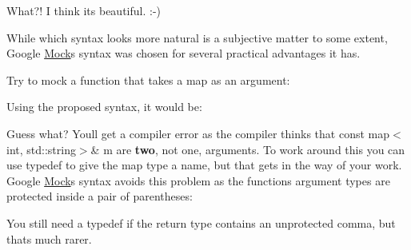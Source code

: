What?! I think it\textquotesingle{}s beautiful. \+:-\/)

While which syntax looks more natural is a subjective matter to some extent, Google \mbox{\hyperlink{class_mock}{Mock}}\textquotesingle{}s syntax was chosen for several practical advantages it has.

Try to mock a function that takes a map as an argument\+: 
\begin{DoxyCode}{0}
\end{DoxyCode}


Using the proposed syntax, it would be\+: 
\begin{DoxyCode}{0}
\end{DoxyCode}


Guess what? You\textquotesingle{}ll get a compiler error as the compiler thinks that {\ttfamily const map$<$int, std\+::string$>$\& m} are {\bfseries{two}}, not one, arguments. To work around this you can use {\ttfamily typedef} to give the map type a name, but that gets in the way of your work. Google \mbox{\hyperlink{class_mock}{Mock}}\textquotesingle{}s syntax avoids this problem as the function\textquotesingle{}s argument types are protected inside a pair of parentheses\+: 
\begin{DoxyCode}{0}
\end{DoxyCode}


You still need a {\ttfamily typedef} if the return type contains an unprotected comma, but that\textquotesingle{}s much rarer.

